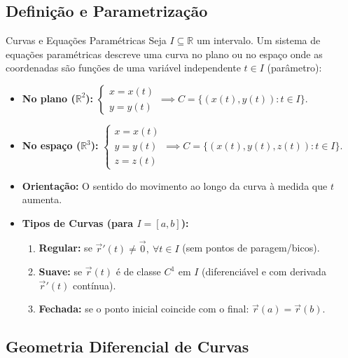 \documentclass[11pt,a4paper]{article}
\newcommand{\R}{\mathbb{R}}
\begin{document}
\vspace{-4pt}
\subsection{Definição e Parametrização}
\vspace{-2pt}

\begin{definitionbox}[before=\vspace{2pt}, after=\vspace{2pt}, top=4pt, bottom=4pt]{Curvas e Equações Paramétricas}
  Seja $I \subseteq \R$ um intervalo. Um sistema de equações paramétricas descreve uma curva no plano ou no espaço onde as coordenadas são funções de uma variável independente $t \in I$ (parâmetro):
  \begin{itemize}[noitemsep, topsep=1pt, parsep=0pt]
    \item \textbf{No plano ($\R^2$):} $\begin{cases} x = x(t) \\ y = y(t) \end{cases} \implies C = \{(x(t), y(t)) : t \in I\}$.
    \item \textbf{No espaço ($\R^3$):} $\begin{cases} x = x(t) \\ y = y(t) \\ z = z(t) \end{cases} \implies C = \{(x(t), y(t), z(t)) : t \in I\}$.
    \item \textbf{Orientação:} O sentido do movimento ao longo da curva à medida que $t$ aumenta.
    \item \textbf{Tipos de Curvas (para $I = [a, b]$):}
      \begin{enumerate}[noitemsep, topsep=1pt, parsep=0pt]
        \item \textbf{Regular:} se $\vec{r}'(t) \neq \vec{0}, \ \forall t \in I$ (sem pontos de paragem/bicos).
        \item \textbf{Suave:} se $\vec{r}(t)$ é de classe $C^1$ em $I$ (diferenciável e com derivada $\vec{r}'(t)$ contínua).
        \item \textbf{Fechada:} se o ponto inicial coincide com o final: $\vec{r}(a) = \vec{r}(b)$.
      \end{enumerate}
  \end{itemize}
\end{definitionbox}

\vspace{-4pt}
\subsection{Geometria Diferencial de Curvas}
\vspace{-2pt}
\end{document}
